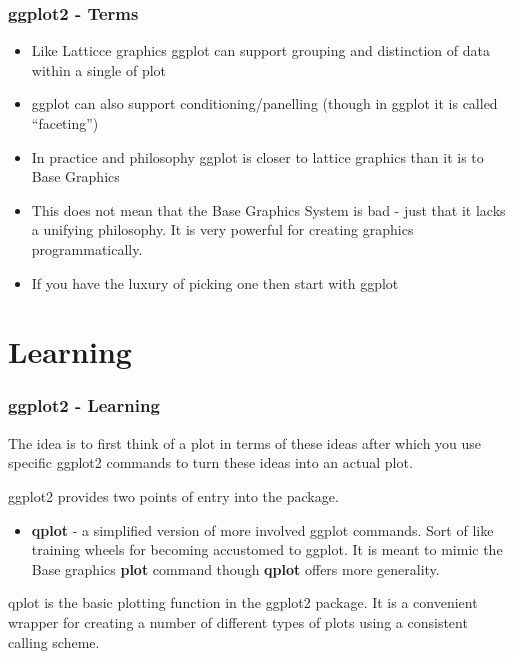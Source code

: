 \documentclass{beamer}
\begin{document}
\begin{frame}[fragile]
\frametitle{ggplot2 - Terms}
\begin{itemize}
\item Like Latticce graphics ggplot can support grouping and distinction of data within a single of plot

\item ggplot can also support conditioning/panelling (though in ggplot it is called ``faceting'')

\item In practice and philosophy ggplot is closer to lattice graphics than it is to Base Graphics

\item This does not mean that the Base Graphics System is bad - just that it lacks a unifying philosophy. It is very powerful for creating graphics programmatically.

\item If you have the luxury of picking one then start with ggplot

\end{itemize}
\end{frame}




\section{Learning}

\begin{frame}[fragile]
\frametitle{ggplot2 - Learning}
The idea is to first think of a plot in terms of these ideas after which you use specific ggplot2 commands to turn these ideas into an actual plot. 

ggplot2 provides two points of entry into the package.

\begin{itemize}
\item \textbf{qplot} - a simplified version of more involved ggplot commands. Sort of like training wheels for becoming accustomed to ggplot. It is meant to mimic the Base graphics \textbf{plot} command though \textbf{qplot} offers more generality.
\end{itemize}

qplot is the basic plotting function in the ggplot2 package. It is a convenient wrapper for creating a number of different types of plots using a consistent calling scheme.
\end{frame}
\end{document}
